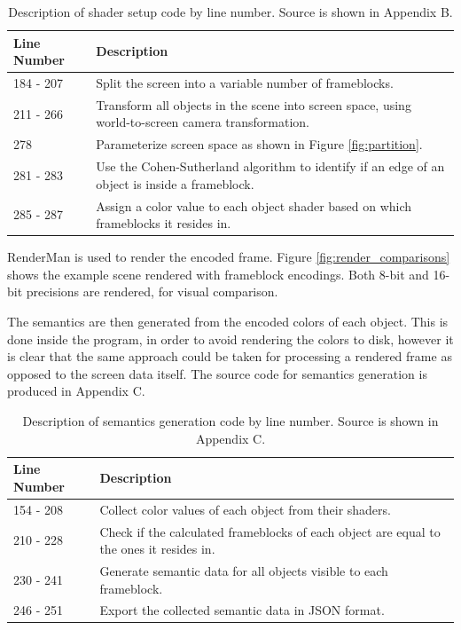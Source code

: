 \documentclass[conference]{IEEEtran}
\begin{document}
\begin{table}[t]
\begin{centering}
\bgroup
\def\arraystretch{1.5}
\begin{tabular}{| m{} | m{} |} 
\hline
Line Number & Description \\ 
\hline
\hline
184 - 207 & Split the screen into a variable number of frameblocks. \\
211 - 266 & Transform all objects in the scene into screen space, using world-to-screen camera transformation. \\
278       & Parameterize screen space as shown in Figure \ref{fig:partition}. \\
281 - 283 & Use the Cohen-Sutherland algorithm to identify if an edge of an object is inside a frameblock. \\
285 - 287 & Assign a color value to each object shader based on which frameblocks it resides in. \\
\hline
\end{tabular}
\caption{Description of shader setup code by line number.
Source is shown in Appendix B.}
\label{tbl:fits}
\egroup
\end{centering}
\end{table}

RenderMan is used to render the encoded frame.
Figure \ref{fig:render_comparisons}
shows the example scene rendered with frameblock encodings.
Both 8-bit and 16-bit precisions are rendered, for visual comparison.

The semantics are then generated from the encoded colors of each object.
This is done inside the program, in order to avoid rendering the colors to disk,
however it is clear that the same approach could be taken for processing a
rendered frame as opposed to the screen data itself.
The source code for semantics generation is produced in Appendix C.

\begin{table}[t]
\begin{centering}
\bgroup
\def\arraystretch{1.5}
\begin{tabular}{| m{} | m{} |} 
\hline
Line Number & Description \\ 
\hline
\hline
154 - 208 & Collect color values of each object from their shaders. \\
210 - 228 & Check if the calculated frameblocks of each object are equal to the ones it
resides in. \\
230 - 241 & Generate semantic data for all objects visible to each frameblock. \\
246 - 251 & Export the collected semantic data in JSON format. \\
\hline
\end{tabular}
\caption{Description of semantics generation code by line number.
Source is shown in Appendix C.}
\label{tbl:fits}
\egroup
\end{centering}
\end{table}
\end{document}
